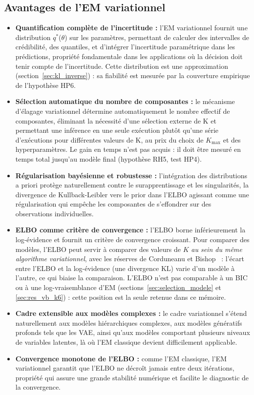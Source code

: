 \subsection{Avantages de l'EM variationnel}\label{sec:avantages_de_l_em_variationnel}
\begin{itemize}
\item \textbf{Quantification complète de l'incertitude : }l'EM variationnel fournit une distribution $q^{*}$($\theta $) sur les paramètres, permettant de calculer des intervalles de crédibilité, des quantiles, et d'intégrer l'incertitude paramétrique dans les prédictions, propriété fondamentale dans les applications où la décision doit tenir compte de l'incertitude. Cette distribution est une approximation (section~\ref{sec:kl_inverse}) : sa fiabilité est mesurée par la couverture empirique de l'hypothèse HP6.
\item \textbf{Sélection automatique du nombre de composantes : }le mécanisme d'élagage variationnel détermine automatiquement le nombre effectif de composantes, éliminant la nécessité d'une sélection externe de K et permettant une inférence en une seule exécution plutôt qu'une série d'exécutions pour différentes valeurs de K, au prix du choix de $K_{\max}$ et des hyperparamètres. Le gain en temps n'est pas acquis : il doit être mesuré en temps total jusqu'au modèle final (hypothèse RH5, test HP4).
\item \textbf{Régularisation bayésienne et robustesse : }l'intégration des distributions a priori protège naturellement contre le surapprentissage et les singularités, la divergence de Kullback-Leibler vers le prior dans l'ELBO agissant comme une régularisation qui empêche les composantes de s'effondrer sur des observations individuelles.
\item \textbf{ELBO comme critère de convergence : }l'ELBO borne inférieurement la log-évidence et fournit un critère de convergence croissant. Pour comparer des modèles, l'ELBO peut servir à comparer des valeurs de $K$ \emph{au sein du même algorithme variationnel}, avec les réserves de Corduneanu et Bishop~\cite{corduneanu2001} : l'écart entre l'ELBO et la log-évidence (une divergence KL) varie d'un modèle à l'autre, ce qui biaise la comparaison. L'ELBO n'est pas comparable à un BIC ou à une log-vraisemblance d'EM (sections~\ref{sec:selection_modele} et \ref{sec:res_vb_k6}) : cette position est la seule retenue dans ce mémoire.
\item \textbf{Cadre extensible aux modèles complexes : }le cadre variationnel s'étend naturellement aux modèles hiérarchiques complexes, aux modèles génératifs profonds tels que les VAE, ainsi qu'aux modèles comportant plusieurs niveaux de variables latentes, là où l'EM classique devient difficilement applicable.
\item \textbf{Convergence monotone de l'ELBO : }comme l'EM classique, l'EM variationnel garantit que l'ELBO ne décroît jamais entre deux itérations, propriété qui assure une grande stabilité numérique et facilite le diagnostic de la convergence.
\end{itemize}
